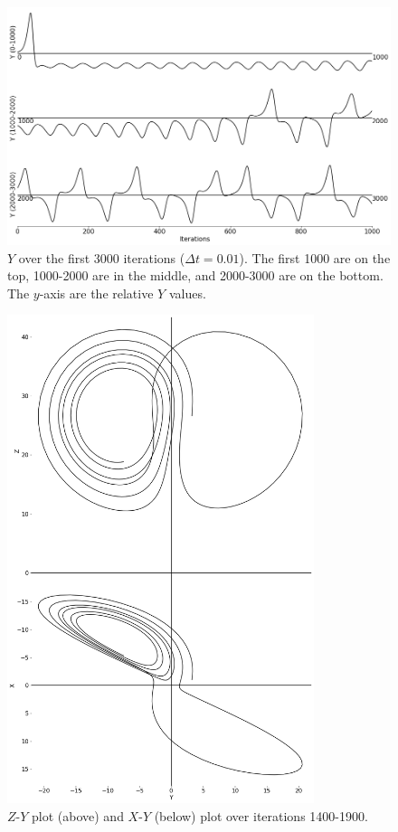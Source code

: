 \documentclass{article}
\begin{document}
\begin{figure}[H]
\begin{center}
    \includegraphics[width=\textwidth]{figures/lorenz 1.png}
\end{center}
\vspace{-2em}
    \caption{$Y$ over the first 3000 iterations ($\Delta t=0.01$). The first 1000 are on the top, 1000-2000 are in the middle, and 2000-3000 are on the bottom. The $y$-axis are the relative $Y$ values.}
    \label{fig:2}
\end{figure}

\begin{figure}[H]
\begin{center}
    \includegraphics[width=0.8\textwidth]{figures/lorenz 2.png}
\end{center}
\vspace{-2em}
    \caption{$Z$-$Y$ plot (above) and $X$-$Y$ (below) plot over iterations 1400-1900.}
    \label{fig:3}
\end{figure}
\end{document}
